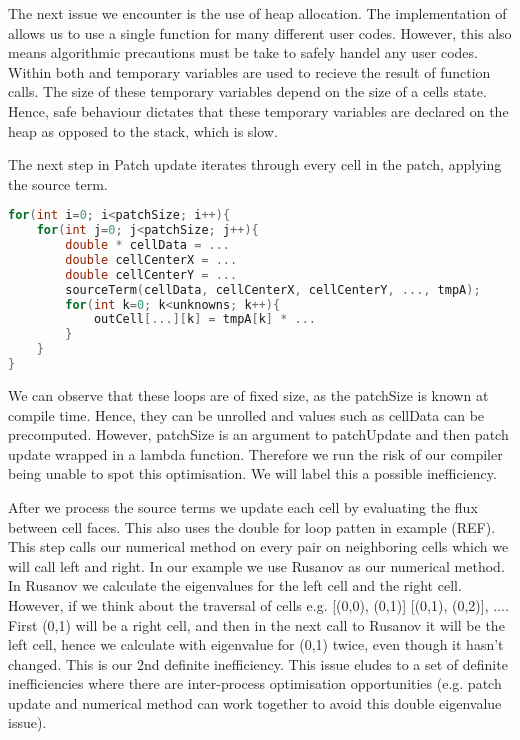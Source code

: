 The next issue we encounter is the use of heap allocation.
The implementation of  allows us to use a single function for many different user codes.
However, this also means algorithmic precautions must be take to safely handel any user codes.
Within both  and  temporary variables are used to recieve the result of function calls.
The size of these temporary variables depend on the size of a cells state.
Hence, safe behaviour dictates that these temporary variables are declared on the heap as opposed to the stack, which is slow. 









The next step in Patch update iterates through every cell in the patch, applying the source term.
\begin{lstlisting}[language=c]
for(int i=0; i<patchSize; i++){
    for(int j=0; j<patchSize; j++){
        double * cellData = ...
        double cellCenterX = ...
        double cellCenterY = ...    
        sourceTerm(cellData, cellCenterX, cellCenterY, ..., tmpA);
        for(int k=0; k<unknowns; k++){
            outCell[...][k] = tmpA[k] * ...
        }
    }
}
\end{lstlisting}


We can observe that these loops are of fixed size, as the patchSize is known at compile time. 
Hence, they can be unrolled and values such as cellData can be precomputed.   
However, patchSize is an argument to patchUpdate and then patch update wrapped in a lambda function.
Therefore we run the risk of our compiler being unable to spot this optimisation.
We will label this a possible inefficiency.



After we process the source terms we update each cell by evaluating the flux between cell faces.
This also uses the double for loop patten in example (REF). %
This step calls our numerical method on every pair on neighboring cells which we will call left and right.
In our example we use Rusanov as our numerical method.
In Rusanov we calculate the eigenvalues for the left cell and the right cell.
However, if we think about the traversal of cells e.g. [(0,0), (0,1)] [(0,1), (0,2)], .... First (0,1) will be a right cell, and then in the next call to Rusanov it will be the left cell, hence we calculate with eigenvalue for (0,1) twice, even though it hasn't changed.
This is our 2nd definite inefficiency.
This issue eludes to a set of definite inefficiencies where there are inter-process optimisation opportunities (e.g. patch update and numerical method can work together to avoid this double eigenvalue issue).   


